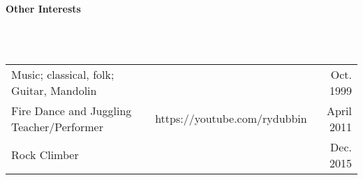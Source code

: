 \documentclass[a4paper,11pt]{article}
\newcommand{\lsep}{-0.2cm}
\newcommand{\resheading}[1]{{\small \colorbox{mygrey}{\begin{minipage}{0.975\textwidth}{\textbf{#1 \vphantom{p\^{E}}}}\end{minipage}}}}
\begin{document}

\resheading{\textbf{Other Interests} }\\[\lsep]
\\[0.2cm]
\indent \begin{tabular}{  l  r   r } 
\indent Music; classical, folk; Guitar, Mandolin & \indent  & \indent \indent Oct. 1999\\
\indent Fire Dance and Juggling Teacher/Performer & \indent https://youtube.com/rydubbin  & \indent  \indent April 2011\\
\indent Rock Climber & \indent  & \indent \indent Dec. 2015\\
\end{tabular}



\end{document}
